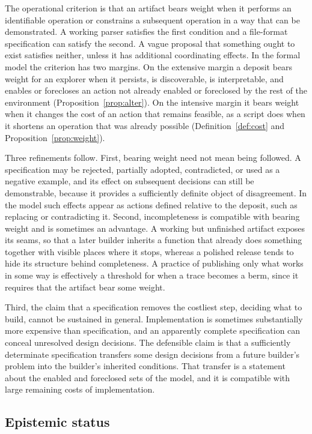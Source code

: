 \documentclass[11pt]{article}
\theoremstyle{definition}
\theoremstyle{remark}
\begin{document}
The operational criterion is that an artifact bears weight when it performs an identifiable operation or constrains a subsequent operation in a way that can be demonstrated. A working parser satisfies the first condition and a file-format specification can satisfy the second. A vague proposal that something ought to exist satisfies neither, unless it has additional coordinating effects. In the formal model the criterion has two margins. On the extensive margin a deposit bears weight for an explorer when it persists, is discoverable, is interpretable, and enables or forecloses an action not already enabled or foreclosed by the rest of the environment (Proposition~\ref{prop:alter}). On the intensive margin it bears weight when it changes the cost of an action that remains feasible, as a script does when it shortens an operation that was already possible (Definition~\ref{def:cost} and Proposition~\ref{prop:weight}).

Three refinements follow. First, bearing weight need not mean being followed. A specification may be rejected, partially adopted, contradicted, or used as a negative example, and its effect on subsequent decisions can still be demonstrable, because it provides a sufficiently definite object of disagreement. In the model such effects appear as actions defined relative to the deposit, such as replacing or contradicting it. Second, incompleteness is compatible with bearing weight and is sometimes an advantage. A working but unfinished artifact exposes its seams, so that a later builder inherits a function that already does something together with visible places where it stops, whereas a polished release tends to hide its structure behind completeness. A practice of publishing only what works in some way is effectively a threshold for when a trace becomes a berm, since it requires that the artifact bear some weight.

Third, the claim that a specification removes the costliest step, deciding what to build, cannot be sustained in general. Implementation is sometimes substantially more expensive than specification, and an apparently complete specification can conceal unresolved design decisions. The defensible claim is that a sufficiently determinate specification transfers some design decisions from a future builder's problem into the builder's inherited conditions. That transfer is a statement about the enabled and foreclosed sets of the model, and it is compatible with large remaining costs of implementation.

\subsection{Epistemic status}
\end{document}
